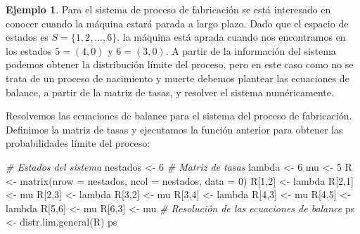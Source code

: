 \documentclass[
]{book}
\newenvironment{Shaded}{\begin{snugshade}}{\end{snugshade}}
\newcommand{\AttributeTok}[1]{\textcolor[rgb]{0.77,0.63,0.00}{#1}}
\newcommand{\CommentTok}[1]{\textcolor[rgb]{0.56,0.35,0.01}{\textit{#1}}}
\newcommand{\DecValTok}[1]{\textcolor[rgb]{0.00,0.00,0.81}{#1}}
\newcommand{\FunctionTok}[1]{\textcolor[rgb]{0.00,0.00,0.00}{#1}}
\newcommand{\NormalTok}[1]{#1}
\newcommand{\OtherTok}[1]{\textcolor[rgb]{0.56,0.35,0.01}{#1}}
\theoremstyle{definition}
\theoremstyle{definition}
\newtheorem{example}{Ejemplo}[chapter]
\theoremstyle{definition}
\theoremstyle{definition}
\theoremstyle{remark}
\begin{document}
\begin{example}
Para el sistema de proceso de fabricación se está interesado en conocer cuando la máquina estará parada a largo plazo. Dado que el espacio de estados es \(S = \{1, 2,...,6\}.\) la máquina está aprada cuando nos encontramos en los estados \(5 = (4, 0)\) y \(6 = (3, 0)\). A partir de la información del sistema podemos obtener la distribución límite del proceso, pero en este caso como no se trata de un proceso de nacimiento y muerte debemos plantear las ecuaciones de balance, a partir de la matriz de tasas, y resolver el sistema numéricamente.
\end{example}

Resolvemos las ecuaciones de balance para el sistema del proceso de fabricación. Definimos la matriz de tasas y ejecutamos la función anterior para obtener las probabilidades límite del proceso:

\begin{Shaded}
\begin{Highlighting}[]
\CommentTok{\# Estados del sistema}
\NormalTok{nestados }\OtherTok{\textless{}{-}} \DecValTok{6}
\CommentTok{\# Matriz de tasas}
\NormalTok{lambda }\OtherTok{\textless{}{-}} \DecValTok{6}
\NormalTok{mu }\OtherTok{\textless{}{-}} \DecValTok{5}
\NormalTok{R }\OtherTok{\textless{}{-}} \FunctionTok{matrix}\NormalTok{(}\AttributeTok{nrow =}\NormalTok{ nestados, }\AttributeTok{ncol =}\NormalTok{ nestados, }\AttributeTok{data =} \DecValTok{0}\NormalTok{)}
\NormalTok{R[}\DecValTok{1}\NormalTok{,}\DecValTok{2}\NormalTok{] }\OtherTok{\textless{}{-}}\NormalTok{ lambda }
\NormalTok{R[}\DecValTok{2}\NormalTok{,}\DecValTok{1}\NormalTok{] }\OtherTok{\textless{}{-}}\NormalTok{ mu}
\NormalTok{R[}\DecValTok{2}\NormalTok{,}\DecValTok{3}\NormalTok{] }\OtherTok{\textless{}{-}}\NormalTok{ lambda }
\NormalTok{R[}\DecValTok{3}\NormalTok{,}\DecValTok{2}\NormalTok{] }\OtherTok{\textless{}{-}}\NormalTok{ mu}
\NormalTok{R[}\DecValTok{3}\NormalTok{,}\DecValTok{4}\NormalTok{] }\OtherTok{\textless{}{-}}\NormalTok{ lambda}
\NormalTok{R[}\DecValTok{4}\NormalTok{,}\DecValTok{3}\NormalTok{] }\OtherTok{\textless{}{-}}\NormalTok{ mu}
\NormalTok{R[}\DecValTok{4}\NormalTok{,}\DecValTok{5}\NormalTok{] }\OtherTok{\textless{}{-}}\NormalTok{ lambda}
\NormalTok{R[}\DecValTok{5}\NormalTok{,}\DecValTok{6}\NormalTok{] }\OtherTok{\textless{}{-}}\NormalTok{ mu}
\NormalTok{R[}\DecValTok{6}\NormalTok{,}\DecValTok{3}\NormalTok{] }\OtherTok{\textless{}{-}}\NormalTok{ mu}
\CommentTok{\# Resolución  de las ecuaciones de balance}
\NormalTok{ps }\OtherTok{\textless{}{-}} \FunctionTok{distr.lim.general}\NormalTok{(R)}
\NormalTok{ps}
\end{Highlighting}
\end{Shaded}
\end{document}

